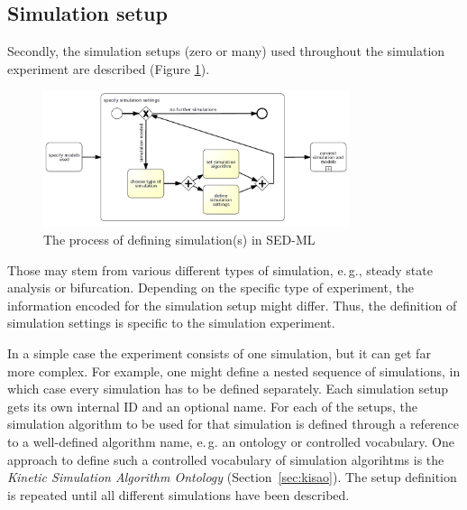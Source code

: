 \subsection{Simulation setup}
\label{overview:simulation}
Secondly, the simulation setups (zero or many) used throughout the simulation experiment are described (Figure \ref{fig:workflowSimulation}). 
%
%
\begin{figure}[h]
\centering
\includegraphics[width=0.8\textwidth]{images/bpmn/sedSimulationOryx.png}
\caption{The process of defining simulation(s) in SED-ML}
\label{fig:workflowSimulation}
\end{figure}
%
Those may stem from various different types of simulation, e.\,g., steady state analysis or bifurcation.  Depending on the specific type of experiment, the information encoded for the simulation setup might differ. Thus, the definition of simulation settings is specific to the simulation experiment.

In a simple case the experiment consists of one simulation, but it can get far more complex. For example, one might define a nested sequence of simulations, in which case every simulation has to be defined separately.
Each simulation setup gets its own internal ID and an optional name. For each of the setups, the simulation algorithm to be used for that simulation is defined through a reference to a well-defined algorithm name, e.\,g. an ontology or controlled vocabulary. One approach to define such a controlled vocabulary of simulation algorihtms is the \emph{Kinetic Simulation Algorithm Ontology} (Section~\ref{sec:kisao}). 
%
The setup definition is repeated until all different simulations have been described.


